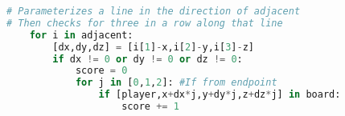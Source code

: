 \documentclass[12pt,a4paper]{article}
\begin{document}
\begin{lstlisting}[language=Python, caption=from gs.check\_result()]
# Parameterizes a line in the direction of adjacent
# Then checks for three in a row along that line
    for i in adjacent:
        [dx,dy,dz] = [i[1]-x,i[2]-y,i[3]-z]
        if dx != 0 or dy != 0 or dz != 0:
            score = 0
            for j in [0,1,2]: #If from endpoint
                if [player,x+dx*j,y+dy*j,z+dz*j] in board:
                    score += 1
\end{lstlisting}
\end{document}
